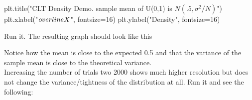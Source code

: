 \begin{fullwidth}
{\begin{pyverbatim}
plt.title("CLT Density Demo. sample mean of U(0,1) is $N(.5, \sigma^2/N)$")
plt.xlabel("$\\overline{X}$", fontsize=16)
plt.ylabel("Density", fontsize=16)
\end{pyverbatim}
}

\step Run it. The resulting graph should look like this \\


Notice how the mean is close to the expected 0.5 and that the variance of the sample mean is close to the theoretical variance.\\

\step Increasing the number of trials two 2000 shows much higher resolution but does not change the variance/tightness of the distribution at all. Run it and see the following:



\end{fullwidth}
